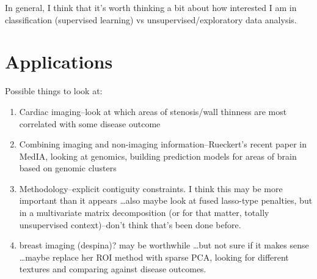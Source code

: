 \documentclass{nih}
\begin{document}
In general, I think that it's worth thinking a bit about how interested I am in classification (supervised learning) vs unsupervised/exploratory data analysis.  

\section{Applications}
Possible things to look at: 
\begin{enumerate}
\item Cardiac imaging--look at which areas of stenosis/wall thinness are most correlated with some disease outcome
\item Combining imaging and non-imaging information--Rueckert's recent paper in MedIA, looking at genomics, building prediction models for areas of brain based on genomic clusters
\item Methodology--explicit contiguity constraints.  I think this may be more important than it appears \ldots also maybe look at fused lasso-type penalties, but in a multivariate matrix decomposition (or for that matter, totally unsupervised context)--don't think that's been done before. 
\item breast imaging (despina)? may be worthwhile \ldots but not sure if it makes sense \ldots maybe replace her ROI method with sparse PCA, looking for different textures and comparing against disease outcomes. 
\end{enumerate}



\end{document}
